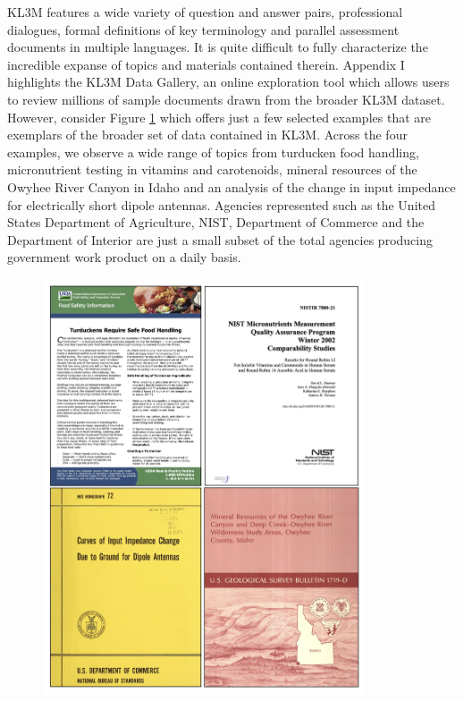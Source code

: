 KL3M features a wide variety of question and answer pairs, professional dialogues, formal definitions of key terminology and parallel assessment documents in multiple languages.  It is quite difficult to fully characterize the incredible expanse of topics and materials contained therein.  Appendix I highlights the KL3M Data Gallery, an online exploration tool which allows users to review millions of sample documents drawn from the broader KL3M dataset.  However, consider Figure \ref{fig:KL3MImages} which offers just a few selected examples that are exemplars of the broader set of data contained in KL3M.  Across the four examples, we observe a wide range of topics from turducken food handling, micronutrient testing in vitamins and carotenoids, mineral resources of the Owyhee River Canyon in Idaho and an analysis of the change in input impedance for electrically short dipole antennas.  Agencies represented such as the United States Department of Agriculture, NIST, Department of Commerce and the Department of Interior are just a small subset of the total agencies producing government work product on a daily basis.

\begin{figure}[H]
\centering
\includegraphics[width=95mm]{KL3MImages.png}
\caption{}
\label{fig:KL3MImages}
\end{figure}

